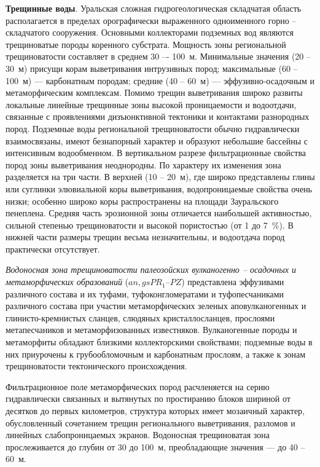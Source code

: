 \textbf{Трещинные воды}. Уральская сложная гидрогеологическая складчатая область располагается в пределах орографически выраженного одноименного горно -- складчатого сооружения. Основными коллекторами подземных вод являются трещиноватые породы коренного субстрата. Мощность зоны региональной трещиноватости составляет в среднем 30 –- 100~м. Минимальные значения (20 -- 30~м) присущи корам выветривания интрузивных пород; максимальные (60  -- 100~м)  --- карбонатным породам; средние (40 -- 60~м) --- эффузивно-осадочным и метаморфическим комплексам. Помимо трещин выветривания широко развиты локальные линейные трещинные зоны высокой проницаемости и водоотдачи, связанные с проявлениями дизъюнктивной тектоники и контактами разнородных пород. Подземные воды региональной трещиноватости обычно гидравлически взаимосвязаны, имеют безнапорный характер и образуют небольшие бассейны с интенсивным водообменном. В вертикальном разрезе фильтрационные свойства пород зоны выветривания неоднородны. По характеру их изменения зона разделяется на три части. В верхней (10 -- 20~м), где широко представлены глины или суглинки элювиальной коры выветривания, водопроницаемые свойства очень низки; особенно широко коры распространены на площади Зауральского пенеплена. Средняя часть эрозионной зоны отличается наибольшей активностью, сильной степенью трещиноватости и высокой пористостью (от 1 до 7~\%). В нижней части размеры трещин весьма незначительны, и водоотдача пород практически отсутствует.

\textit{Водоносная зона трещиноватости палеозойских вулканогенно -- осадочных и метаморфических образований} ($an, gsPR_1–PZ$) представлена эффузивами различного состава и их туфами, туфоконгломератами и туфопесчаниками различного состава при участии метаморфических зеленых аповулканогенных и глинисто-кремнистых сланцев, слюдяных кристаллосланцев, прослоями метапесчаников и метаморфизованных известняков. Вулканогенные породы и метаморфиты обладают близкими коллекторскими свойствами; подземные воды в них приурочены к грубообломочным и карбонатным прослоям, а также к зонам трещиноватости тектонического происхождения. 

Фильтрационное поле метаморфических пород расчленяется на серию гидравлически связанных и вытянутых по простиранию блоков шириной от десятков до первых километров, структура которых имеет мозаичный характер, обусловленный сочетанием трещин регионального выветривания, разломов и линейных слабопроницаемых экранов. Водоносная трещиноватая зона прослеживается до глубин от 30 до 100~м, преобладающие значения --- до 40 -- 60~м.

